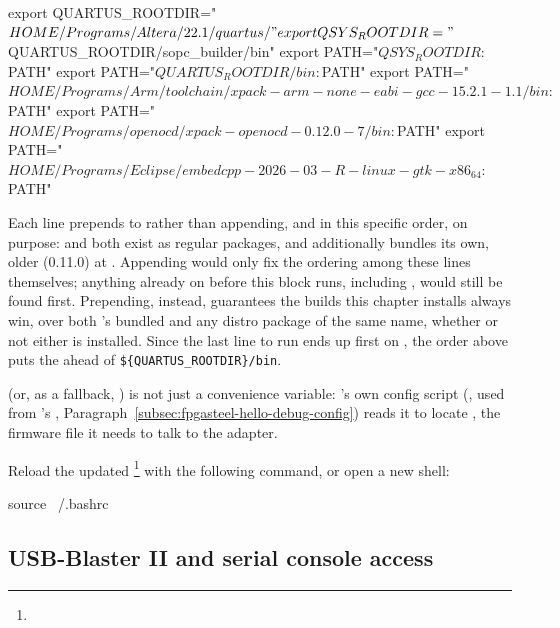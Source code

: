 \begin{shellcodehost}
export QUARTUS_ROOTDIR="$HOME/Programs/Altera/22.1/quartus/"
export QSYS_ROOTDIR="${QUARTUS_ROOTDIR}/sopc_builder/bin"
export PATH="${QSYS_ROOTDIR}:$PATH"
export PATH="${QUARTUS_ROOTDIR}/bin:$PATH"
export PATH="$HOME/Programs/Arm/toolchain/xpack-arm-none-eabi-gcc-15.2.1-1.1/bin:$PATH"
export PATH="$HOME/Programs/openocd/xpack-openocd-0.12.0-7/bin:$PATH"
export PATH="$HOME/Programs/Eclipse/embedcpp-2026-03-R-linux-gtk-x86_64:$PATH"
\end{shellcodehost}

Each line prepends to  rather than appending, and in this specific order, on purpose:  and  both exist as regular  packages, and  additionally bundles its own, older  (0.11.0) at . Appending would only fix the ordering among these lines themselves; anything already on  before this block runs, including , would still be found first. Prepending, instead, guarantees the  builds this chapter installs always win, over both 's bundled  and any distro package of the same name, whether or not either is installed. Since the last line to run ends up first on , the order above puts the  ahead of \lstinline[style=inlineFsExt]!${QUARTUS_ROOTDIR}/bin!.

 (or, as a fallback, ) is not just a convenience variable: 's own  config script (, used from 's , Paragraph~\ref{subsec:fpgasteel-hello-debug-config}) reads it to locate , the  firmware file it needs to talk to the  adapter.

Reload the updated \footnote{} with the following command, or open a new shell:

\begin{shellcodehost}
source ~/.bashrc
\end{shellcodehost}

\subsection{USB-Blaster II and serial console access}
\label{subsec:fpgasteel-usb-blaster}

